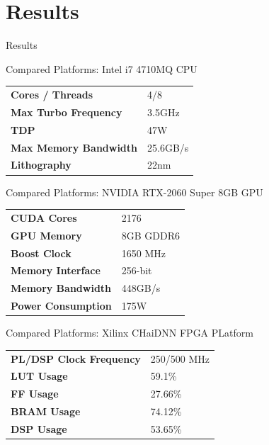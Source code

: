 \setlength{\parskip}{\baselineskip}
\section{Results}

\begin{frame}
	\huge Results
\end{frame}

\begin{frame}{Compared Platforms: Intel i7 4710MQ CPU}
	\begin{table}[H]
		\centering
		\begin{tabular}{ll}
			\toprule
			\textbf{Cores / Threads}      & 4/8      \\
			\textbf{Max Turbo Frequency}  & 3.5GHz   \\
			\textbf{TDP}                  & 47W      \\
			\textbf{Max Memory Bandwidth} & 25.6GB/s \\
			\textbf{Lithography}          & 22nm     \\
			\bottomrule
		\end{tabular}
	\end{table}
\end{frame}

\begin{frame}{Compared Platforms: NVIDIA RTX-2060 Super 8GB GPU}
	\begin{table}[H]
		\centering
		\begin{tabular}{ll}
			\toprule
			\textbf{CUDA Cores}        & 2176      \\
			\textbf{GPU Memory}        & 8GB GDDR6 \\
			\textbf{Boost Clock}       & 1650 MHz  \\
			\textbf{Memory Interface}  & 256-bit   \\
			\textbf{Memory Bandwidth}  & 448GB/s   \\
			\textbf{Power Consumption} & 175W      \\
			\bottomrule
		\end{tabular}
	\end{table}
\end{frame}

\begin{frame}{Compared Platforms: Xilinx CHaiDNN FPGA PLatform}
	\begin{table}[H]
		\centering
		\begin{tabular}{ll}
			\toprule
			\textbf{PL/DSP Clock Frequency} & 250/500 MHz \\
			\textbf{LUT Usage}              & 59.1\%      \\
			\textbf{FF Usage}               & 27.66\%     \\
			\textbf{BRAM Usage}             & 74.12\%     \\
			\textbf{DSP Usage}              & 53.65\%     \\
			\bottomrule
		\end{tabular}
	\end{table}
\end{frame}

